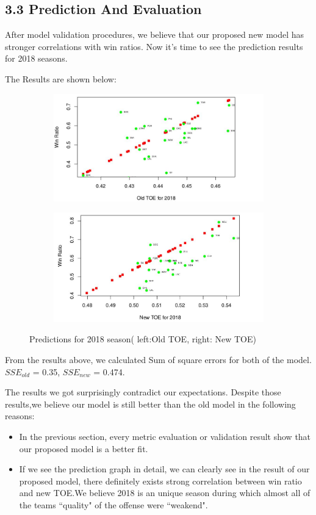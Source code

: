 \documentclass[11pt]{article}
\begin{document}
\subsection*{3.3 Prediction And Evaluation}
After model validation procedures, we believe that our proposed new model has stronger correlations with win ratios.
Now it's time to see the prediction results for 2018 seasons.

The Results are shown below:

\begin{figure}[h!]
  \centering
  \begin{subfigure}[b]{0.45\linewidth}
    \includegraphics[width=\linewidth]{old_toe.jpg}
  \end{subfigure}
  \begin{subfigure}[b]{0.45\linewidth}
    \includegraphics[width=\linewidth]{new_toe_pred.jpg}
  \end{subfigure}
  \caption{Predictions for 2018 season( left:Old TOE, right: New TOE)}
\end{figure}
From the results above, we calculated Sum of square errors for both of the model. $SSE_{old}$ = 0.35, $SSE_{new}$ = 0.474.

The results we got surprisingly contradict our expectations. 
Despite those results,we believe our model is still better than the old model in the following reasons:
\begin{itemize}
\item In the previous section, every metric evaluation or validation result show that our proposed model is a better fit.
\item If we see the prediction graph in detail, we can clearly see in the result of our proposed model, there definitely exists strong correlation between win ratio and new TOE.We believe 2018 is an unique season during which almost all of the teams ``quality" of the offense were ``weakend".
\end{itemize}
\end{document}
